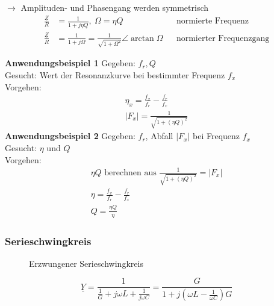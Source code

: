 $\rightarrow$ Amplituden- und Phasengang werden symmetrisch\\
\begin{align}
 	\frac{\underline{Z}}{R} &= \frac{1}{1+j\eta Q},\ \Omega=\eta Q
 	&&\text{normierte Frequenz}\nonumber\\
 	\frac{\underline{Z}}{R} &= \frac{1}{1+j\Omega} =
 	\frac{1}{\sqrt{1+\Omega^2}}\angle
 	\arctan{\Omega} &&\text{normierter
 	Frequenzgang}\nonumber
\end{align}

\textbf{Anwendungsbeispiel 1}
Gegeben: $f_r, Q$\\
Gesucht: Wert der Resonanzkurve bei bestimmter Frequenz $f_x$\\
Vorgehen:\\
\begin{align}
	\eta_x=\frac{f_x}{f_r}-\frac{f_r}{f_x}\nonumber\\
	\left| F_x \right| = \frac{1}{\sqrt{1+(\eta Q)^2}}\nonumber
\end{align}
\textbf{Anwendungsbeispiel 2}
Gegeben: $f_r$, Abfall $\left|F_x\right|$ bei Frequenz $f_x$\\
Gesucht: $\eta$ und $Q$\\
Vorgehen:\\
\begin{align}
	\eta Q \text{ berechnen aus } \frac{1}{\sqrt{1+(\eta Q)^2}} = \left| F_x
	\right|\nonumber\\
	\eta = \frac{f_x}{f_r}-\frac{f_r}{f_x}\nonumber\\
	Q = \frac{\eta Q}{\eta}\nonumber
\end{align}

\subsubsection{Serieschwingkreis}
\begin{wrapfigure}{l}{0.55\textwidth}
\centering
	
	\vspace{-0.15cm}
	\caption{Erzwungener Serieschwingkreis}
	\label{fig:SerieSKErzwungen}
\end{wrapfigure}


$$\underline{Y} = \frac{1}{\frac{1}{G}+j\omega L+\frac{1}{j\omega C}} =
	\frac{G}{1+j(\omega L-\frac{1}{\omega C})G}$$\\

